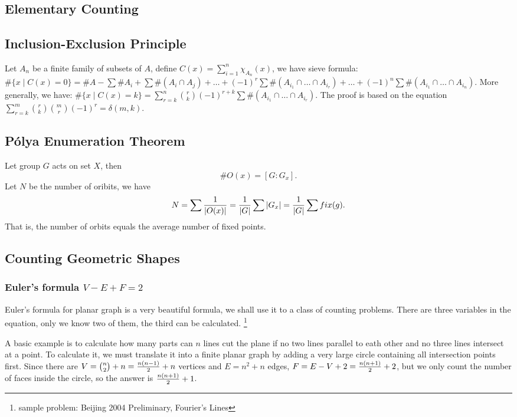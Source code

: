 \subsection{Elementary Counting}
\subsection{Inclusion-Exclusion Principle}
Let $A_n$ be a finite family of subsets of $A$,
define $C(x)=\sum_{i=1}^{n}\chi_{A_n}(x)$,
we have sieve formula:
$\#\{x\mid C(x)=0\}=\#A - \sum\#A_i + \sum\#(A_i\cap A_j) + \dots
 + (-1)^r\sum\#(A_{i_1}\cap\dots\cap A_{i_r}) + \dots
 + (-1)^n\sum\#(A_{i_1}\cap\dots\cap A_{i_n})$.
More generally, we have:
$\#\{x\mid C(x)=k\}=\sum_{r=k}^{n}{r\choose k}(-1)^{r+k}\sum\#(A_{i_1}\cap \dots \cap A_{i_r})$.
The proof is based on the equation $\sum_{r=k}^{m}{r\choose k}{m\choose r}(-1)^r=\delta(m,k)$.

\subsection{P\'olya Enumeration Theorem}
Let group $G$ acts on set $X$, then $$\#O(x)=[G:G_x].$$
Let $N$ be the number of oribits, we have
$$N=\sum{1\over \left| O(x)\right|}
={1\over{\left| G\right|}}\sum{\left| G_x\right|}
={1\over{\left| G\right|}}\sum fix(g).$$
That is, the number of orbits equals the average number of fixed points.

\subsection{Counting Geometric Shapes}
\subsubsection{Euler's formula $V-E+F=2$}
Euler's formula for planar graph is a very beautiful formula,
we shall use it to a class of counting problems.
There are three variables in the equation, only we know two of them, the third can be calculated.
\footnote{sample problem: Beijing 2004 Preliminary, Fourier's Lines}

A basic example is to calculate how many parts can $n$ lines cut the plane if no two lines parallel
to eath other and no three lines intersect at a point. To calculate it, we must translate it into a
finite planar graph by adding a very large circle containing all intersection points first.
Since there are $V={n\choose 2}+n={n(n-1)\over 2} + n$ vertices
and $E=n^{2} + n$ edges, $F=E-V+2={n(n+1)\over 2} + 2$, but we only count the number of faces inside the
circle, so the answer is ${n(n+1)\over 2} + 1$.

